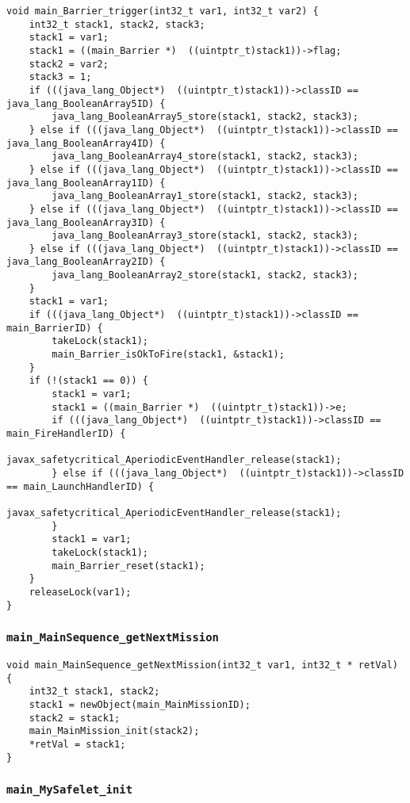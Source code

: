 \begin{landscape}
\begin{multicols}{2}
\begin{lstlisting}[firstnumber=1803]
void main_Barrier_trigger(int32_t var1, int32_t var2) {
	int32_t stack1, stack2, stack3;
	stack1 = var1;
	stack1 = ((main_Barrier *)  ((uintptr_t)stack1))->flag;
	stack2 = var2;
	stack3 = 1;
	if (((java_lang_Object*)  ((uintptr_t)stack1))->classID == java_lang_BooleanArray5ID) {
		java_lang_BooleanArray5_store(stack1, stack2, stack3);
	} else if (((java_lang_Object*)  ((uintptr_t)stack1))->classID == java_lang_BooleanArray4ID) {
		java_lang_BooleanArray4_store(stack1, stack2, stack3);
	} else if (((java_lang_Object*)  ((uintptr_t)stack1))->classID == java_lang_BooleanArray1ID) {
		java_lang_BooleanArray1_store(stack1, stack2, stack3);
	} else if (((java_lang_Object*)  ((uintptr_t)stack1))->classID == java_lang_BooleanArray3ID) {
		java_lang_BooleanArray3_store(stack1, stack2, stack3);
	} else if (((java_lang_Object*)  ((uintptr_t)stack1))->classID == java_lang_BooleanArray2ID) {
		java_lang_BooleanArray2_store(stack1, stack2, stack3);
	}
	stack1 = var1;
	if (((java_lang_Object*)  ((uintptr_t)stack1))->classID == main_BarrierID) {
		takeLock(stack1);
		main_Barrier_isOkToFire(stack1, &stack1);
	}
	if (!(stack1 == 0)) {
		stack1 = var1;
		stack1 = ((main_Barrier *)  ((uintptr_t)stack1))->e;
		if (((java_lang_Object*)  ((uintptr_t)stack1))->classID == main_FireHandlerID) {
			javax_safetycritical_AperiodicEventHandler_release(stack1);
		} else if (((java_lang_Object*)  ((uintptr_t)stack1))->classID == main_LaunchHandlerID) {
			javax_safetycritical_AperiodicEventHandler_release(stack1);
		}
		stack1 = var1;
		takeLock(stack1);
		main_Barrier_reset(stack1);
	}
	releaseLock(var1);
}
\end{lstlisting}

\subsubsection{\texttt{main\_MainSequence\_getNextMission}}

\begin{lstlisting}[firstnumber=1847]
void main_MainSequence_getNextMission(int32_t var1, int32_t * retVal) {
	int32_t stack1, stack2;
	stack1 = newObject(main_MainMissionID);
	stack2 = stack1;
	main_MainMission_init(stack2);
	*retVal = stack1;
}
\end{lstlisting}

\subsubsection{\texttt{main\_MySafelet\_init}}


\end{multicols}
\end{landscape}
